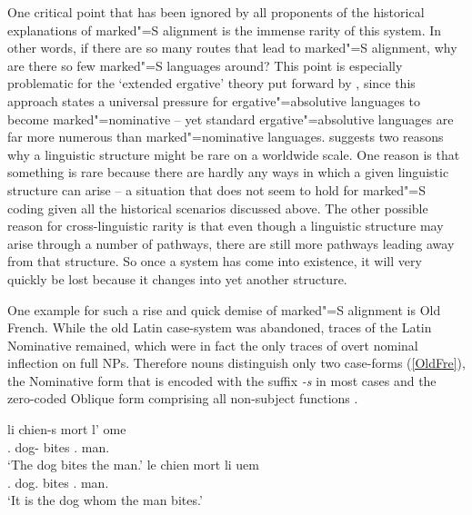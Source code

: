 One critical point that has been ignored by all proponents of the historical explanations of marked"=S alignment is the immense rarity of this system. 
In other words, if there are so many routes that lead to marked"=S alignment, why are there so few marked"=S languages around?
This point is especially problematic for the `extended ergative' theory put forward by \citet{Dixon:1994}, since this approach states a universal pressure for ergative"=absolutive languages to become marked"=nominative -- yet standard ergative"=absolutive languages are far more numerous than marked"=nominative languages.
\citet[312--313]{Maslova:2000} suggests two reasons why a linguistic structure might be rare on a worldwide scale. 
One reason is that something is rare because there are hardly any ways in which a given linguistic structure can arise -- a situation that does not seem to hold for marked"=S coding given all the historical scenarios discussed above.  
The other possible reason for cross-linguistic rarity is that even though a linguistic structure may arise through a number of pathways, there are still more pathways leading away from that structure. 
So once a system has come into existence, it will very quickly be lost because it changes into yet another structure.

One example for such a rise and quick demise of marked"=S alignment is Old French. 
While the old Latin case-system was abandoned, traces of the Latin Nominative remained, which were in fact the only traces of overt nominal inflection on full NPs. 
Therefore nouns distinguish only two case-forms (\ref{OldFre}), the Nominative form  that is encoded with the suffix \emph{-s} in most cases and the zero-coded Oblique form comprising all non-subject functions \citep[182]{Detges:2009,Jespersen:1992}.

\begin{exe} \ex\label{OldFre}
\begin{xlist}
\ex\label{OldFreNom}\gll li chien-s mort l' ome\\
\deter{}.\sbj{} dog-\nom{} bites \deter{}.\obl{} man.\obl{} \\
\glt `The dog bites the man.'
\ex\label{OldFreObl}\gll le chien mort li uem\\
\deter{}.\obl{} dog.\obl{} bites \deter{}.\nom{} man.\nom{}\\
\glt `It is the dog whom the man bites.'
\end{xlist}
\end{exe}

